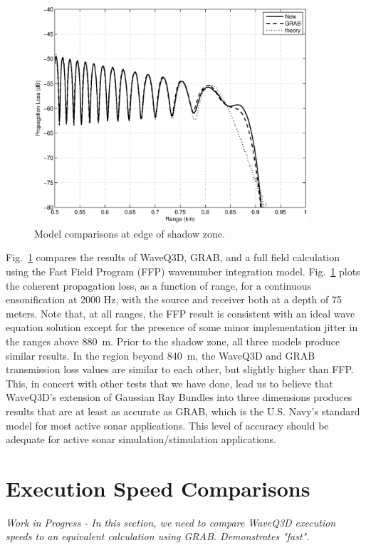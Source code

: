 \documentclass{ws-jca}
\begin{document}
\begin{figure}[th]
	\centerline{\includegraphics[width=4in]{pedersen_shallow_compare.eps}} 
	\vspace*{8pt}
	\caption{Model comparisons at edge of shadow zone. \label{fig:n2_shallow}}
\end{figure}

Fig.~\ref{fig:n2_shallow} compares the results of WaveQ3D, GRAB, and a full field calculation using the Fast Field Program (FFP) wavenumber integration model.\cite{DiNapoli1980,Brekhovskikh1980}  
Fig.~\ref{fig:n2_shallow} plots the coherent propagation loss, as a function of range, for a continuous ensonification at 2000 Hz, with the source and receiver both at a depth of 75 meters.  Note that, at all ranges, the FFP result is consistent with an ideal wave equation solution except for the presence of some minor implementation jitter in the ranges above 880~m.  Prior to the shadow zone, all three models produce similar results. In the region beyond 840~m, the WaveQ3D and GRAB transmission loss values are similar to each other, but slightly higher than FFP. This, in concert with other tests that we have done, lead us to believe that WaveQ3D's extension of Gaussian Ray Bundles into three dimensions produces results that are at least as accurate as GRAB, which is the U.S. Navy's standard model for most active sonar applications.  This level of accuracy should be adequate for active sonar simulation/stimulation applications.

\section{Execution Speed Comparisons}

\emph{Work in Progress - In this section, we need to compare WaveQ3D execution speeds to an equivalent calculation using GRAB.  Demonstrates "fast".}
\end{document}

